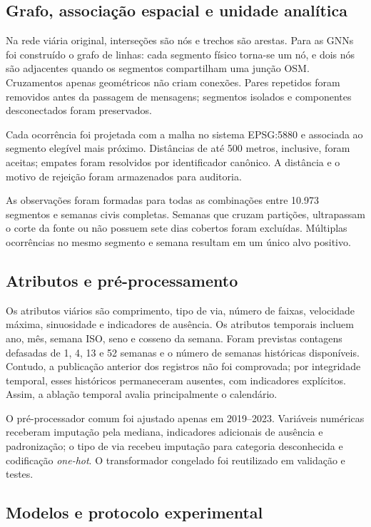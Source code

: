 \documentclass[12pt]{article}
\begin{document}
\subsection{Grafo, associação espacial e unidade analítica}

Na rede viária original, interseções são nós e trechos são arestas.
Para as GNNs foi construído o grafo de linhas: cada segmento físico
torna-se um nó, e dois nós são adjacentes quando os segmentos
compartilham uma junção OSM. Cruzamentos apenas geométricos não criam
conexões. Pares repetidos foram removidos antes da passagem de
mensagens; segmentos isolados e componentes desconectados foram
preservados.

Cada ocorrência foi projetada com a malha no sistema EPSG:5880 e
associada ao segmento elegível mais próximo. Distâncias de até 500
metros, inclusive, foram aceitas; empates foram resolvidos por
identificador canônico. A distância e o motivo de rejeição foram
armazenados para auditoria.

As observações foram formadas para todas as combinações entre 10.973
segmentos e semanas civis completas. Semanas que cruzam partições,
ultrapassam o corte da fonte ou não possuem sete dias cobertos foram
excluídas. Múltiplas ocorrências no mesmo segmento e semana resultam em
um único alvo positivo.

\subsection{Atributos e pré-processamento}

Os atributos viários são comprimento, tipo de via, número de faixas,
velocidade máxima, sinuosidade e indicadores de ausência. Os atributos
temporais incluem ano, mês, semana ISO, seno e cosseno da semana. Foram
previstas contagens defasadas de 1, 4, 13 e 52 semanas e o número de
semanas históricas disponíveis. Contudo, a publicação anterior dos
registros não foi comprovada; por integridade temporal, esses históricos
permaneceram ausentes, com indicadores explícitos. Assim, a ablação
temporal avalia principalmente o calendário.

O pré-processador comum foi ajustado apenas em 2019--2023. Variáveis
numéricas receberam imputação pela mediana, indicadores adicionais de
ausência e padronização; o tipo de via recebeu imputação para categoria
desconhecida e codificação \textit{one-hot}. O transformador congelado
foi reutilizado em validação e testes.

\subsection{Modelos e protocolo experimental}
\end{document}
